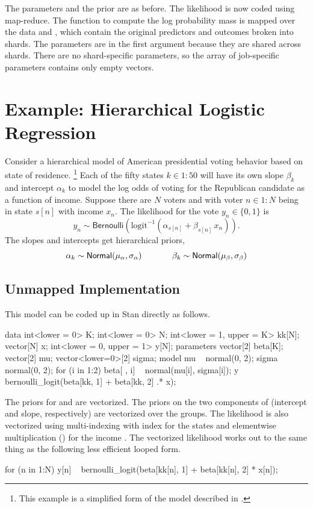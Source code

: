The parameters and the prior are as before.  The likelihood is now
coded using map-reduce.  The function  to compute the log
probability mass is mapped over the data  and ,
which contain the original predictors and outcomes broken into shards.
The parameters  are in the first argument because they are
shared across shards.  There are no shard-specific parameters, so
the array of job-specific parameters  contains only empty
vectors.

\section{Example:  Hierarchical Logistic Regression}

Consider a hierarchical model of American presidential voting behavior
based on state of residence.%
%
\footnote{This example is a simplified form of the model
  described in \cite[Section~14.2]{GelmanHill:2007}.}
%
Each of the fifty states $k \in 1{:}50$ will have its own slope
$\beta_k$ and intercept $\alpha_k$ to model the log odds of voting for
the Republican candidate as a function of income.  Suppose there are
$N$ voters and with voter $n \in 1{:}N$ being in state $s[n]$ with
income $x_n$.  The likelihood for the vote $y_n \in \{ 0, 1 \}$ is
%
\[
y_n \sim \mathsf{Bernoulli}
\left(
  \mathrm{logit}^{-1}\left( \alpha_{s[n]} +  \beta_{s[n]} \, x_n \right)
\right).
\]
%
The slopes and intercepts get hierarchical priors,
%
\[
\mbox{ }
\hfill
\alpha_k \sim \mathsf{Normal}(\mu_{\alpha}, \sigma_{\alpha})
\hspace*{0.5in}
\beta_k \sim \mathsf{Normal}(\mu_{\beta}, \sigma_{\beta})
\hfill
\mbox{ }
\]

\subsection{Unmapped Implementation}

This model can be coded up in Stan directly as follows.
%
\begin{stancode}
data {
  int<lower = 0> K;
  int<lower = 0> N;
  int<lower = 1, upper = K> kk[N];
  vector[N] x;
  int<lower = 0, upper = 1> y[N];
}
parameters {
  vector[2] beta[K];
  vector[2] mu;
  vector<lower=0>[2] sigma;
}
model {
  mu ~ normal(0, 2);
  sigma ~ normal(0, 2);
  for (i in 1:2)
    beta[ , i] ~ normal(mu[i], sigma[i]);
  y ~ bernoulli_logit(beta[kk, 1] + beta[kk, 2] .* x);
}
\end{stancode}
%
The priors for  and  are vectorized.  The priors
on the two components of  (intercept and slope,
respectively) are vectorized over the groups.  The likelihood is also
vectorized using multi-indexing with index  for the states
and elementwise multiplication () for the income .
The vectorized likelihood works out to the same thing as the following
less efficient looped form.
%
\begin{stancode}
for (n in 1:N)
  y[n] ~ bernoulli_logit(beta[kk[n], 1] + beta[kk[n], 2] * x[n]);
\end{stancode}



